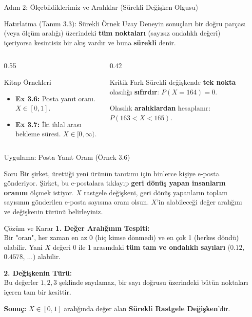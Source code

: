 \documentclass[light]{lutbeamer}
\begin{document}
\begin{frame}{Adım 2: Ölçebildiklerimiz ve Aralıklar (Sürekli Değişken Olgusu)}
\begin{block}{Hatırlatma (Tanım 3.3): Sürekli Örnek Uzay}
  Deneyin sonuçları bir doğru parçası (veya ölçüm aralığı) üzerindeki \textbf{tüm noktaları} (sayısız ondalıklı değeri) içeriyorsa kesintisiz bir akış vardır ve buna \textbf{sürekli} denir.
\end{block}

\begin{columns}[T]
  \begin{column}{0.55\textwidth}
    \begin{exampleblock}{Kitap Örnekleri}
      \begin{itemize}
        \item \textbf{Ex 3.6:} Posta yanıt oranı. $X \in [0, 1]$.
        \item \textbf{Ex 3.7:} İki ihlal arası bekleme süresi. $X \in [0, \infty)$.
      \end{itemize}
    \end{exampleblock}
  \end{column}
  \begin{column}{0.42\textwidth}
    \begin{alertblock}{Kritik Fark}
      Sürekli değişkende \textbf{tek nokta} olasılığı \textbf{sıfırdır}:
      $P(X = 164) = 0$.

      Olasılık \textbf{aralıklardan} hesaplanır:
      $P(163 < X < 165)$.
    \end{alertblock}
  \end{column}
\end{columns}
\end{frame}

\begin{frame}{Uygulama: Posta Yanıt Oranı (Örnek 3.6)}
\small
\begin{block}{Soru}
  Bir şirket, ürettiği yeni ürünün tanıtımı için binlerce kişiye e-posta gönderiyor. 
  Şirket, bu e-postalara tıklayıp \textbf{geri dönüş yapan insanların oranını} ölçmek istiyor. 
  $X$ rastgele değişkeni, geri dönüş yapanların toplam sayısının gönderilen e-posta sayısına oranı olsun.
  $X$'in alabileceği değer aralığını ve değişkenin türünü belirleyiniz.
\end{block}

\begin{alertblock}{Çözüm ve Karar}
  \textbf{1. Değer Aralığının Tespiti:} \\
  Bir "oran", her zaman en az 0 (hiç kimse dönmedi) ve en çok 1 (herkes döndü) olabilir.
  Yani $X$ değeri 0 ile 1 arasındaki \textbf{tüm tam ve ondalıklı sayıları} ($0.12$, $0.4578$, $\dots$) alabilir.
  \vspace{0.15cm}
  
  \textbf{2. Değişkenin Türü:} \\
  Bu değerler $1, 2, 3$ şeklinde sayılamaz, bir sayı doğrusu üzerindeki bütün noktaları içeren tam bir kesittir.
  
  \textbf{Sonuç:} $X \in [0, 1]$ aralığında değer alan \textbf{Sürekli Rastgele Değişken}'dir.
\end{alertblock}
\end{frame}
\end{document}
